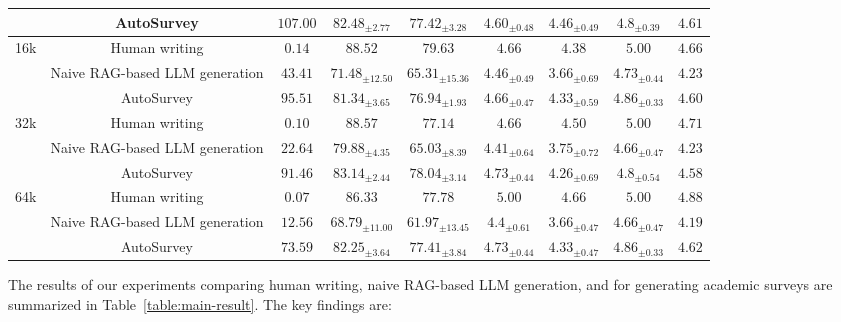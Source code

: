 \begin{table}[ht!]
\begin{adjustbox}{width=0.9\textwidth}
\begin{tabular}{cc|c|cc|cccc}
                       & AutoSurvey         & $107.00$  & $82.48_{\pm 2.77}$ & $77.42_{\pm 3.28}$ & $4.60_{\pm 0.48}$     & $4.46_{\pm 0.49}$      & $4.8_{\pm 0.39}$                   & $4.61$     \\ \midrule
\multirow{3}{*}{16k} 
                       & Human writing      & $0.14$ & $88.52$ & $79.63$  & $4.66$     & $4.38$      & $5.00$                  & $4.66$      \\
                        & Naive RAG-based LLM generation &$43.41$ & $71.48_{\pm 12.50}$ & $65.31_{\pm 15.36}$ & $4.46_{\pm 0.49}$     & $3.66_{\pm 0.69}$      & $4.73_{\pm 0.44}$                 &$4.23$     \\
                       & AutoSurvey    &   $95.51$  & $81.34_{\pm 3.65}$ & $76.94_{\pm 1.93}$   & $4.66_{\pm 0.47}$     & $4.33_{\pm 0.59}$      & $4.86_{\pm 0.33}$                 & $4.60$      \\ \midrule
\multirow{3}{*}{32k}   
                       & Human writing  & $0.10$ & $88.57$ & $77.14$     & $4.66$     & $4.50$      & $5.00$                  & $4.71$      \\
                       & Naive RAG-based LLM generation &$22.64$ & $79.88_{\pm 4.35}$ & $65.03_{\pm 8.39}$ & $4.41_{\pm 0.64}$     & $3.75_{\pm 0.72}$      & $4.66_{\pm 0.47}$                   &$4.23$      \\
                       & AutoSurvey        & $91.46$  & $83.14_{\pm 2.44}$ & $78.04_{\pm 3.14}$    & $4.73_{\pm 0.44}$     & $4.26_{\pm 0.69}$      & $4.8 _{\pm 0.54}$                 & $4.58$      \\ \midrule
\multirow{3}{*}{64k}  
                       & Human writing & $0.07$  & $86.33$ & $77.78$  & $5.00$     & $4.66$      & $5.00$                  & $4.88$      \\
                        & Naive RAG-based LLM generation & $12.56$ &$68.79_{\pm 11.00}$ & $61.97_{\pm 13.45}$ & $4.4 _{\pm 0.61}$     & $3.66_{\pm 0.47}$      & $4.66_{\pm 0.47}$                & $4.19$      \\
                       & AutoSurvey        & $73.59$  & $82.25_{\pm 3.64}$ & $77.41_{\pm 3.84}$  & $4.73_{\pm 0.44}$     & $4.33_{\pm 0.47}$      & $4.86_{\pm 0.33}$                  & $4.62$    \\ \bottomrule
\end{tabular}
\end{adjustbox}
\end{table}

The results of our experiments comparing human writing, naive RAG-based LLM generation, and \ourmethod for generating academic surveys are summarized in Table~\ref{table:main-result}. The key findings are:


